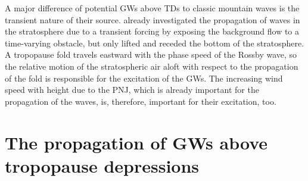 A major difference of potential GWs above TDs to classic mountain waves is the transient nature of their source. \textcite{pfister_gravity_1993} already investigated the propagation of waves in the stratosphere due to a transient forcing by exposing the background flow to a time-varying obstacle, but only lifted and receded the bottom of the stratosphere. A tropopause fold travels eastward with the phase speed of the Rossby wave, so the relative motion of the stratospheric air aloft with respect to the propagation of the fold is responsible for the excitation of the GWs. The increasing wind speed with height due to the PNJ, which is already important for the propagation of the waves, is, therefore, important for their excitation, too.

\section{The propagation of GWs above tropopause depressions}
\label{sec:propagation}

